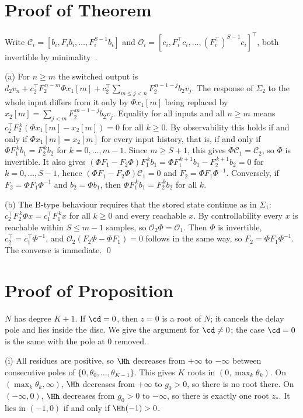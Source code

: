 \section{Proof of Theorem~}\label{app:necessity}

Write $\mathcal C_i=[b_i,F_ib_i,\dots,F_i^{S-1}b_i]$ and $\mathcal O_i=[c_i,F_i^{\top}c_i,\dots,(F_i^{\top})^{S-1}c_i]^{\top}$, both invertible by minimality~\cite{kailath1980}.

(a) For $n\ge m$ the switched output is $d_2v_n+c_2^{\top}F_2^{\,n-m}\Phi x_1[m]+c_2^{\top}\sum_{m\le j<n}F_2^{\,n-1-j}b_2v_j$. The response of $\Sigma_2$ to the whole input differs from it only by $\Phi x_1[m]$ being replaced by $x_2[m]=\sum_{j<m}F_2^{\,m-1-j}b_2v_j$. Equality for all inputs and all $n\ge m$ means $c_2^{\top}F_2^{\,k}(\Phi x_1[m]-x_2[m])=0$ for all $k\ge0$. By observability this holds if and only if $\Phi x_1[m]=x_2[m]$ for every input history, that is, if and only if $\Phi F_1^{\,k}b_1=F_2^{\,k}b_2$ for $k=0,\dots,m-1$. Since $m\ge S+1$, this gives $\Phi\mathcal C_1=\mathcal C_2$, so $\Phi$ is invertible. It also gives $(\Phi F_1-F_2\Phi)F_1^{\,k}b_1=\Phi F_1^{\,k+1}b_1-F_2^{\,k+1}b_2=0$ for $k=0,\dots,S-1$, hence $(\Phi F_1-F_2\Phi)\mathcal C_1=0$ and $F_2=\Phi F_1\Phi^{-1}$. Conversely, if $F_2=\Phi F_1\Phi^{-1}$ and $b_2=\Phi b_1$, then $\Phi F_1^{\,k}b_1=F_2^{\,k}b_2$ for all $k$.

(b) The B-type behaviour requires that the stored state continue as in $\Sigma_1$: $c_2^{\top}F_2^{\,k}\Phi x=c_1^{\top}F_1^{\,k}x$ for all $k\ge0$ and every reachable $x$. By controllability every $x$ is reachable within $S\le m-1$ samples, so $\mathcal O_2\Phi=\mathcal O_1$. Then $\Phi$ is invertible, $c_2^{\top}=c_1^{\top}\Phi^{-1}$, and $\mathcal O_2(F_2\Phi-\Phi F_1)=0$ follows in the same way, so $F_2=\Phi F_1\Phi^{-1}$. The converse is immediate. \qed

\section{Proof of Proposition~}\label{app:stability}

$N$ has degree $K+1$. If $\cd=0$, then $z=0$ is a root of $N$; it cancels the delay pole and lies inside the disc. We give the argument for $\cd\neq0$; the case $\cd=0$ is the same with the pole at 0 removed.

(i) All residues are positive, so $\Hh$ decreases from $+\infty$ to $-\infty$ between consecutive poles of $\{0,\theta_0,\dots,\theta_{K-1}\}$. This gives $K$ roots in $(0,\max_k\theta_k)$. On $(\max_k\theta_k,\infty)$, $\Hh$ decreases from $+\infty$ to $g_0>0$, so there is no root there. On $(-\infty,0)$, $\Hh$ decreases from $g_0>0$ to $-\infty$, so there is exactly one root $z_*$. It lies in $(-1,0)$ if and only if $\Hh(-1)>0$.

